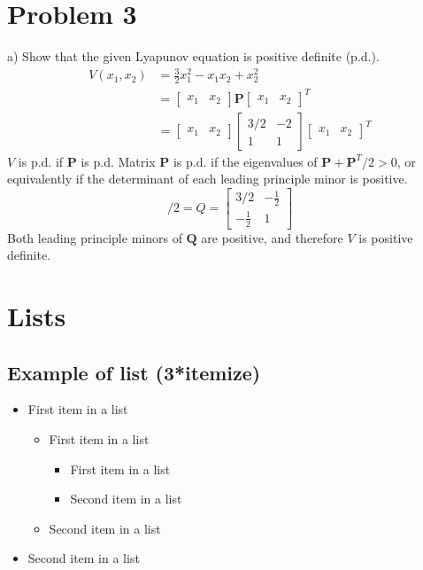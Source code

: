 \documentclass[paper=a4, fontsize=11pt]{scrartcl} %
\numberwithin{equation}{section} %
\numberwithin{figure}{section} %
\numberwithin{table}{section} %
\begin{document}
\section{Problem 3}
a) Show that the given Lyapunov equation is positive definite (p.d.).
\begin{align}
V(x_1, x_2) &= \frac{3}{2} x_1^2-x_1x_2+x_2^2 \\
&= \begin{bmatrix}x_1 & x_2\end{bmatrix} \mathbf{P} \begin{bmatrix}x_1 & x_2\end{bmatrix}^T \\
&= \begin{bmatrix}x_1 & x_2\end{bmatrix} \begin{bmatrix}3/2 & -2\\ 1 & 1\end{bmatrix} \begin{bmatrix}x_1 & x_2\end{bmatrix}^T
\end{align}
$V$ is p.d. if $\mathbf{P}$ is p.d. Matrix $\mathbf{P}$ is p.d. if the eigenvalues of $\mathbf{P}+\mathbf{P}^T/2>0$, or equivalently if the determinant of each leading principle minor is positive.
\begin{equation}
[P+P^T]/2 = Q = \begin{bmatrix}3/2 & -\frac{1}{2}\\ -\frac{1}{2} & 1\end{bmatrix}
\end{equation}
Both leading principle minors of $\mathbf{Q}$ are positive, and therefore $V$ is positive definite.
\newpage

\newpage
\section{Lists}


\subsection{Example of list (3*itemize)}
\begin{itemize}
	\item First item in a list 
		\begin{itemize}
		\item First item in a list 
			\begin{itemize}
			\item First item in a list 
			\item Second item in a list 
			\end{itemize}
		\item Second item in a list 
		\end{itemize}
	\item Second item in a list 
\end{itemize}
\end{document}
